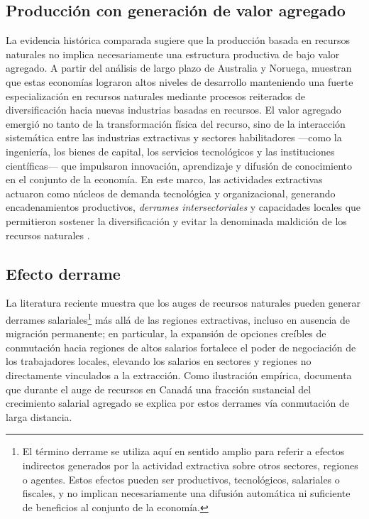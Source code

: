 \documentclass[../../TFM.tex]{subfiles}
\begin{document}
	\subsection{Producción con generación de valor agregado}
	\label{subsec:produccion-valor-agregado}
	
	La evidencia histórica comparada sugiere que la producción basada en recursos naturales no implica necesariamente una estructura productiva de bajo valor agregado. A partir del análisis de largo plazo de Australia y Noruega, \textcite{Ville2013} muestran que estas economías lograron altos niveles de desarrollo manteniendo una fuerte especialización en recursos naturales mediante procesos reiterados de diversificación hacia nuevas industrias basadas en recursos. El valor agregado emergió no tanto de la transformación física del recurso, sino de la interacción sistemática entre las industrias extractivas y sectores habilitadores —como la ingeniería, los bienes de capital, los servicios tecnológicos y las instituciones científicas— que impulsaron innovación, aprendizaje y difusión de conocimiento en el conjunto de la economía. En este marco, las actividades extractivas actuaron como núcleos de demanda tecnológica y organizacional, generando encadenamientos productivos, \textit{derrames intersectoriales} y capacidades locales que permitieron sostener la diversificación y evitar la denominada maldición de los recursos naturales \parencite{Ville2013}.
	
	\subsection{Efecto derrame}
	\label{subsec:efecto-derrame}
	
	La literatura reciente muestra que los auges de recursos naturales pueden generar derrames salariales\footnote{El término derrame se utiliza aquí en sentido amplio para referir a efectos indirectos generados por la actividad extractiva sobre otros sectores, regiones o agentes. Estos efectos pueden ser productivos, tecnológicos, salariales o fiscales, y no implican necesariamente una difusión automática ni suficiente de beneficios al conjunto de la economía.} más allá de las regiones extractivas, incluso en ausencia de migración permanente; en particular, la expansión de opciones creíbles de conmutación hacia regiones de altos salarios fortalece el poder de negociación de los trabajadores locales, elevando los salarios en sectores y regiones no directamente vinculados a la extracción. Como ilustración empírica, \textcite{Green2017} documenta que durante el auge de recursos en Canadá una fracción sustancial del crecimiento salarial agregado se explica por estos derrames vía conmutación de larga distancia.
	
\end{document}
